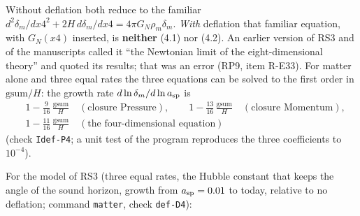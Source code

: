 \documentclass[
  10pt,
]{article}
\begin{document}
Without deflation both reduce to the familiar
\(d^2\delta_m/dx4^2+2H\,d\delta_m/dx4=4\pi G_N\rho_m\delta_m\).
\emph{With} deflation that familiar equation, with \(G_N(x4)\) inserted,
is \textbf{neither} (4.1) nor (4.2). An earlier version of RS3 and of
the manuscripts called it ``the Newtonian limit of the eight-dimensional
theory'' and quoted its results; that was an error (RP9, item R-E33).
For matter alone and three equal rates the three equations can be solved
to the first order in \(\mathrm{gsum}/H\): the growth rate
\(d\ln\delta_m/d\ln a_{\rm sp}\) is \[\begin{aligned}
&1-\tfrac{9}{16}\,\frac{\mathrm{gsum}}{H}\quad(\text{closure Pressure}),\qquad
1-\tfrac{13}{16}\,\frac{\mathrm{gsum}}{H}\quad(\text{closure Momentum}),\\
&1-\tfrac{11}{16}\,\frac{\mathrm{gsum}}{H}\quad(\text{the four-dimensional equation})
\end{aligned}\] (check \texttt{Idef-P4}; a unit test of the program
reproduces the three coefficients to \(10^{-4}\)).

For the model of RS3 (three equal rates, the Hubble constant that keeps
the angle of the sound horizon, growth from \(a_{\rm sp}=0.01\) to
today, relative to no deflation; command \texttt{matter}, check
\texttt{def-D4}):
\end{document}
